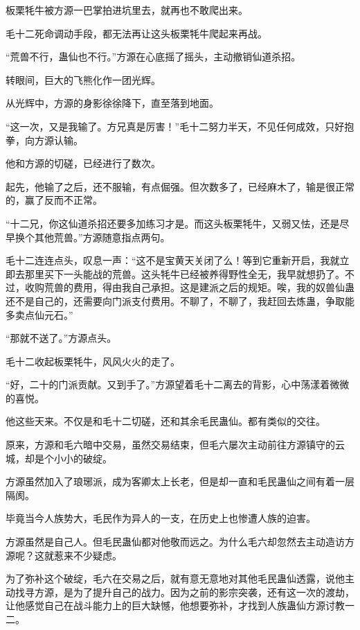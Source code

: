
\begin{this_body}

板栗牦牛被方源一巴掌拍进坑里去，就再也不敢爬出来。

毛十二死命调动手段，都无法再让这头板栗牦牛爬起来再战。

“荒兽不行，蛊仙也不行。”方源在心底摇了摇头，主动撤销仙道杀招。

转眼间，巨大的飞熊化作一团光辉。

从光辉中，方源的身影徐徐降下，直至落到地面。

“这一次，又是我输了。方兄真是厉害！”毛十二努力半天，不见任何成效，只好抱拳，向方源认输。

他和方源的切磋，已经进行了数次。

起先，他输了之后，还不服输，有点倔强。但次数多了，已经麻木了，输是很正常的，赢了反而不正常。

“十二兄，你这仙道杀招还要多加练习才是。而这头板栗牦牛，又弱又怯，还是尽早换个其他荒兽。”方源随意指点两句。

毛十二连连点头，叹息一声：“这不是宝黄天关闭了么！等到它重新开启，我就立即去那里买下一头能战的荒兽。这头牦牛已经被养得野性全无，我早就想扔了。不过，收购荒兽的费用，得由我自己承担。这是建派之后的规矩。唉，我的奴兽仙蛊还不是自己的，还需要向门派支付费用。不聊了，不聊了，我赶回去炼蛊，争取能多卖点仙元石。”

“那就不送了。”方源点头。

毛十二收起板栗牦牛，风风火火的走了。

“好，二十的门派贡献。又到手了。”方源望着毛十二离去的背影，心中荡漾着微微的喜悦。

他这些天来。不仅是和毛十二切磋，还和其余毛民蛊仙。都有类似的交往。

原来，方源和毛六暗中交易，虽然交易结束，但毛六屡次主动前往方源镇守的云城，却是个小小的破绽。

方源虽然加入了琅琊派，成为客卿太上长老，但是却一直和毛民蛊仙之间有着一层隔阂。

毕竟当今人族势大，毛民作为异人的一支，在历史上也惨遭人族的迫害。

方源虽然是自己人。但毛民蛊仙都对他敬而远之。为什么毛六却忽然去主动造访方源呢？这就惹来不少疑虑。

为了弥补这个破绽，毛六在交易之后，就有意无意地对其他毛民蛊仙透露，说他主动找寻方源，是为了提升自己的战力。因为之前的影宗突袭，还有这一次的渡劫，让他感觉自己在战斗能力上的巨大缺憾，他想要弥补，才找到人族蛊仙方源讨教一二。


\end{this_body}
